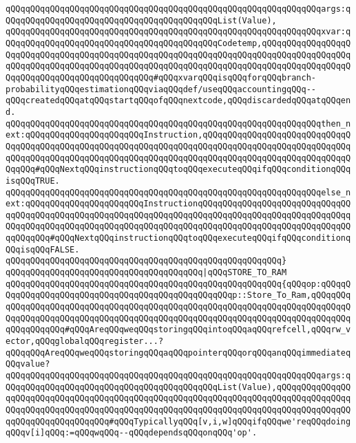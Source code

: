\verb|qQQqqQQqqQQqqQQqqQQqqQQqqQQqqQQqqQQqqQQqqQQqqQQqqQQqqQQqqQQqqQQqargs:qQQqqQQqqQQqqQQqqQQqqQQqqQQqqQQqqQQqqQQqqQQqList(Value),|\newline
\verb|qQQqqQQqqQQqqQQqqQQqqQQqqQQqqQQqqQQqqQQqqQQqqQQqqQQqqQQqqQQqqQQqxvar:qQQqqQQqqQQqqQQqqQQqqQQqqQQqqQQqqQQqqQQqqQQqCodetemp,qQQqqQQqqQQqqQQqqQQqqQQqqQQqqQQqqQQqqQQqqQQqqQQqqQQqqQQqqQQqqQQqqQQqqQQqqQQqqQQqqQQqqQQqqQQqqQQqqQQqqQQqqQQqqQQqqQQqqQQqqQQqqQQqqQQqqQQqqQQqqQQqqQQqqQQqqQQqqQQqqQQqqQQqqQQqqQQqqQQqqQQqqQQq#qQQqxvarqQQqisqQQqforqQQqbranch-probabilityqQQqestimationqQQqviaqQQqdef/useqQQqaccountingqQQq--qQQqcreatedqQQqatqQQqstartqQQqofqQQqnextcode,qQQqdiscardedqQQqatqQQqend.|\newline
\verb|qQQqqQQqqQQqqQQqqQQqqQQqqQQqqQQqqQQqqQQqqQQqqQQqqQQqqQQqqQQqqQQqthen_next:qQQqqQQqqQQqqQQqqQQqqQQqInstruction,qQQqqQQqqQQqqQQqqQQqqQQqqQQqqQQqqQQqqQQqqQQqqQQqqQQqqQQqqQQqqQQqqQQqqQQqqQQqqQQqqQQqqQQqqQQqqQQqqQQqqQQqqQQqqQQqqQQqqQQqqQQqqQQqqQQqqQQqqQQqqQQqqQQqqQQqqQQqqQQqqQQqqQQqqQQqqQQq#qQQqNextqQQqinstructionqQQqtoqQQqexecuteqQQqifqQQqconditionqQQqisqQQqTRUE.|\newline
\verb|qQQqqQQqqQQqqQQqqQQqqQQqqQQqqQQqqQQqqQQqqQQqqQQqqQQqqQQqqQQqqQQqelse_next:qQQqqQQqqQQqqQQqqQQqqQQqInstructionqQQqqQQqqQQqqQQqqQQqqQQqqQQqqQQqqQQqqQQqqQQqqQQqqQQqqQQqqQQqqQQqqQQqqQQqqQQqqQQqqQQqqQQqqQQqqQQqqQQqqQQqqQQqqQQqqQQqqQQqqQQqqQQqqQQqqQQqqQQqqQQqqQQqqQQqqQQqqQQqqQQqqQQqqQQqqQQqqQQq#qQQqNextqQQqinstructionqQQqtoqQQqexecuteqQQqifqQQqconditionqQQqisqQQqFALSE.|\newline
\verb|qQQqqQQqqQQqqQQqqQQqqQQqqQQqqQQqqQQqqQQqqQQqqQQqqQQqqQQq}|\newline
\newline
\verb|qQQqqQQqqQQqqQQqqQQqqQQqqQQqqQQqqQQqqQQq|\verb#|qQQqSTORE_TO_RAM#\newline
\verb|qQQqqQQqqQQqqQQqqQQqqQQqqQQqqQQqqQQqqQQqqQQqqQQqqQQqqQQq{qQQqop:qQQqqQQqqQQqqQQqqQQqqQQqqQQqqQQqqQQqqQQqqQQqqQQqqQQqp::Store_To_Ram,qQQqqQQqqQQqqQQqqQQqqQQqqQQqqQQqqQQqqQQqqQQqqQQqqQQqqQQqqQQqqQQqqQQqqQQqqQQqqQQqqQQqqQQqqQQqqQQqqQQqqQQqqQQqqQQqqQQqqQQqqQQqqQQqqQQqqQQqqQQqqQQqqQQqqQQqqQQqqQQq#qQQqAreqQQqweqQQqstoringqQQqintoqQQqaqQQqrefcell,qQQqrw_vector,qQQqglobalqQQqregister...?qQQqqQQqAreqQQqweqQQqstoringqQQqaqQQqpointerqQQqorqQQqanqQQqimmediateqQQqvalue?|\newline
\verb|qQQqqQQqqQQqqQQqqQQqqQQqqQQqqQQqqQQqqQQqqQQqqQQqqQQqqQQqqQQqqQQqargs:qQQqqQQqqQQqqQQqqQQqqQQqqQQqqQQqqQQqqQQqqQQqList(Value),qQQqqQQqqQQqqQQqqQQqqQQqqQQqqQQqqQQqqQQqqQQqqQQqqQQqqQQqqQQqqQQqqQQqqQQqqQQqqQQqqQQqqQQqqQQqqQQqqQQqqQQqqQQqqQQqqQQqqQQqqQQqqQQqqQQqqQQqqQQqqQQqqQQqqQQqqQQqqQQqqQQqqQQqqQQqqQQq#qQQqTypicallyqQQq[v,i,w]qQQqifqQQqwe'reqQQqdoingqQQqv[i]qQQq:=qQQqwqQQq--qQQqdependsqQQqonqQQq'op'.|\newline
